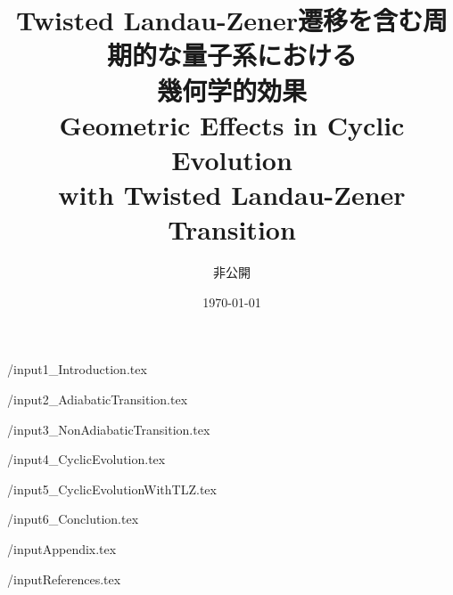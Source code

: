 \documentclass[a4paper, titlepage]{jsreport}
\title{Twisted Landau-Zener遷移を含む周期的な量子系における\\幾何学的効果\\
Geometric Effects in Cyclic Evolution \\with Twisted Landau-Zener Transition}
\author{非公開}
\date{\today}
\begin{document}
 
\maketitle
\tableofcontents
\newpage

/input{1_Introduction.tex}

/input{2_AdiabaticTransition.tex}

/input{3_NonAdiabaticTransition.tex}

/input{4_CyclicEvolution.tex}

/input{5_CyclicEvolutionWithTLZ.tex}

/input{6_Conclution.tex}

/input{Appendix.tex}

/input{References.tex}
\end{document}

